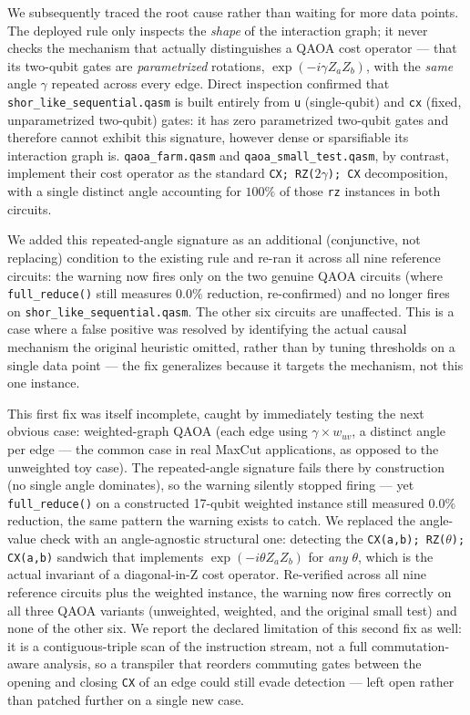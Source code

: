 \documentclass[9pt,twocolumn]{extarticle}
\begin{document}
We subsequently traced the root cause rather than waiting for more data
points. The deployed rule only inspects the \emph{shape} of the
interaction graph; it never checks the mechanism that actually
distinguishes a QAOA cost operator --- that its two-qubit gates are
\emph{parametrized} rotations, $\exp(-i\gamma Z_aZ_b)$, with the
\emph{same} angle $\gamma$ repeated across every edge. Direct inspection
confirmed that \texttt{shor\_like\_sequential.qasm} is built entirely from
\texttt{u} (single-qubit) and \texttt{cx} (fixed, unparametrized
two-qubit) gates: it has zero parametrized two-qubit gates and therefore
cannot exhibit this signature, however dense or sparsifiable its
interaction graph is. \texttt{qaoa\_farm.qasm} and
\texttt{qaoa\_small\_test.qasm}, by contrast, implement their cost
operator as the standard \texttt{CX; RZ($2\gamma$); CX} decomposition,
with a single distinct angle accounting for $100\%$ of those \texttt{rz}
instances in both circuits.

We added this repeated-angle signature as an additional (conjunctive, not
replacing) condition to the existing rule and re-ran it across all nine
reference circuits: the warning now fires only on the two genuine QAOA
circuits (where \texttt{full\_reduce()} still measures $0.0\%$ reduction,
re-confirmed) and no longer fires on \texttt{shor\_like\_sequential.qasm}.
The other six circuits are unaffected. This is a case where a false
positive was resolved by identifying the actual causal mechanism the
original heuristic omitted, rather than by tuning thresholds on a single
data point --- the fix generalizes because it targets the mechanism, not
this one instance.

This first fix was itself incomplete, caught by immediately testing the
next obvious case: weighted-graph QAOA (each edge using
$\gamma \times w_{uv}$, a distinct angle per edge --- the common case in
real MaxCut applications, as opposed to the unweighted toy case). The
repeated-angle signature fails there by construction (no single angle
dominates), so the warning silently stopped firing --- yet
\texttt{full\_reduce()} on a constructed 17-qubit weighted instance still
measured $0.0\%$ reduction, the same pattern the warning exists to catch.
We replaced the angle-value check with an angle-agnostic structural one:
detecting the \texttt{CX(a,b); RZ($\theta$); CX(a,b)} sandwich that
implements $\exp(-i\theta Z_aZ_b)$ for \emph{any} $\theta$, which is the
actual invariant of a diagonal-in-Z cost operator. Re-verified across all
nine reference circuits plus the weighted instance, the warning now fires
correctly on all three QAOA variants (unweighted, weighted, and the
original small test) and none of the other six. We report the declared
limitation of this second fix as well: it is a contiguous-triple scan of
the instruction stream, not a full commutation-aware analysis, so a
transpiler that reorders commuting gates between the opening and closing
\texttt{CX} of an edge could still evade detection --- left open rather
than patched further on a single new case.
\end{document}
